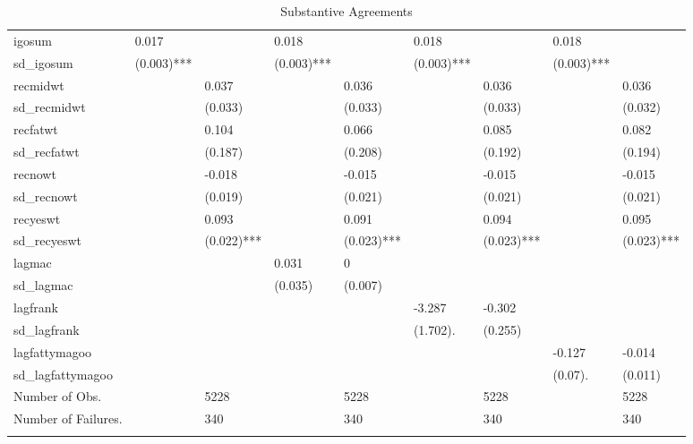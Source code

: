 \begin{table}[ht]
\begin{tabular}{lllllllll}
  igosum & 0.017 &  & 0.018 &  & 0.018 &  & 0.018 &  \\ 
  sd\_igosum & (0.003)*** &  & (0.003)*** &  & (0.003)*** &  & (0.003)*** &  \\ 
  recmidwt &  & 0.037 &  & 0.036 &  & 0.036 &  & 0.036 \\ 
  sd\_recmidwt &  & (0.033)  &  & (0.033)  &  & (0.033)  &  & (0.032)  \\ 
  recfatwt &  & 0.104 &  & 0.066 &  & 0.085 &  & 0.082 \\ 
  sd\_recfatwt &  & (0.187)  &  & (0.208)  &  & (0.192)  &  & (0.194)  \\ 
  recnowt &  & -0.018 &  & -0.015 &  & -0.015 &  & -0.015 \\ 
  sd\_recnowt &  & (0.019)  &  & (0.021)  &  & (0.021)  &  & (0.021)  \\ 
  recyeswt &  & 0.093 &  & 0.091 &  & 0.094 &  & 0.095 \\ 
  sd\_recyeswt &  & (0.022)*** &  & (0.023)*** &  & (0.023)*** &  & (0.023)*** \\ 
  lagmac &  &  & 0.031 & 0 &  &  &  &  \\ 
  sd\_lagmac &  &  & (0.035)  & (0.007)  &  &  &  &  \\ 
  lagfrank &  &  &  &  & -3.287 & -0.302 &  &  \\ 
  sd\_lagfrank &  &  &  &  & (1.702). & (0.255)  &  &  \\ 
  lagfattymagoo &  &  &  &  &  &  & -0.127 & -0.014 \\ 
  sd\_lagfattymagoo &  &  &  &  &  &  & (0.07). & (0.011)  \\ 
  Number of Obs. &  & 5228 &  & 5228 &  & 5228 &  & 5228 \\ 
  Number of Failures. &  & 340 &  & 340 &  & 340 &  & 340 \\ 
   \hline \footnotesize{  }
\end{tabular}
\caption{Substantive Agreements} 
\end{table}
